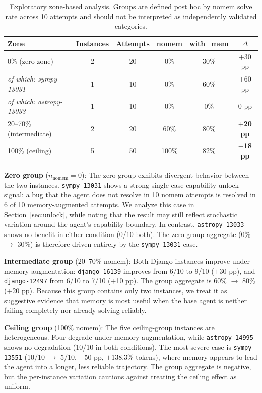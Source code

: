\documentclass[runningheads]{llncs}
\begin{document}
\begin{table}[h]
\centering
\caption{Exploratory zone-based analysis. Groups are defined post hoc by nomem solve rate across 10 attempts and should not be interpreted as independently validated categories.}
\label{tab:zone}
\begin{tabular}{lccccc}
\toprule
\textbf{Zone} & \textbf{Instances} & \textbf{Attempts} & \textbf{nomem} & \textbf{with\_mem} & \textbf{$\Delta$} \\
\midrule
0\% (zero zone) & 2 & 20 & 0\% & 30\% & $+$30 pp \\
\quad\textit{of which: sympy-13031} & 1 & 10 & 0\% & 60\% & $+$60 pp \\
\quad\textit{of which: astropy-13033} & 1 & 10 & 0\% & 0\% & 0 pp \\
\midrule
20--70\% (intermediate) & 2 & 20 & 60\% & 80\% & $\mathbf{+}$\textbf{20 pp} \\
\midrule
100\% (ceiling) & 5 & 50 & 100\% & 82\% & $\mathbf{-}$\textbf{18 pp} \\
\bottomrule
\end{tabular}
\end{table}

\textbf{Zero group} ($n_{\text{nomem}}=0$): The zero group exhibits divergent behavior between the two instances. \texttt{sympy-13031} shows a strong single-case capability-unlock signal: a bug that the agent does not resolve in 10 nomem attempts is resolved in 6 of 10 memory-augmented attempts. We analyze this case in Section~\ref{sec:unlock}, while noting that the result may still reflect stochastic variation around the agent's capability boundary. In contrast, \texttt{astropy-13033} shows no benefit in either condition (0/10 both). The zero group aggregate (0\% $\to$ 30\%) is therefore driven entirely by the \texttt{sympy-13031} case.

\textbf{Intermediate group} (20--70\% nomem): Both Django instances improve under memory augmentation: \texttt{django-16139} improves from 6/10 to 9/10 ($+$30 pp), and \texttt{django-12497} from 6/10 to 7/10 ($+$10 pp). The group aggregate is 60\% $\to$ 80\% ($+$20 pp). Because this group contains only two instances, we treat it as suggestive evidence that memory is most useful when the base agent is neither failing completely nor already solving reliably.

\textbf{Ceiling group} (100\% nomem): The five ceiling-group instances are heterogeneous. Four degrade under memory augmentation, while \texttt{astropy-14995} shows no degradation (10/10 in both conditions). The most severe case is \texttt{sympy-13551} (10/10 $\to$ 5/10, $-$50 pp, $+$138.3\% tokens), where memory appears to lead the agent into a longer, less reliable trajectory. The group aggregate is negative, but the per-instance variation cautions against treating the ceiling effect as uniform.
\end{document}
